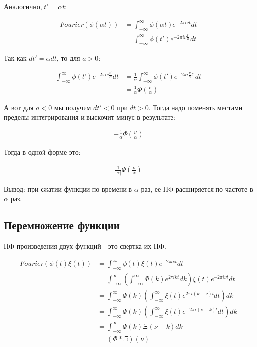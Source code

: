 \documentclass[a4paper,12pt]{report}
\begin{document}
    Аналогично, $t' = \alpha t$:
    
    \[
        \begin{aligned}
            Fourier\left(\phi(\alpha t)\right)
            &= \int_{-\infty}^{\infty} \phi(\alpha t) e^{-2\pi i\nu t} dt \\
            &= \int_{-\infty}^{\infty} \phi(t') e^{-2\pi i\nu \frac{t'}{\alpha}} dt
        \end{aligned}
    \]
    
    Так как $dt' = \alpha dt$, то для $a > 0$:
    
    \[
        \begin{aligned}
            \int_{-\infty}^{\infty} \phi(t') e^{-2\pi i\nu \frac{t'}{\alpha}} dt
            &= \frac{1}{\alpha} \int_{-\infty}^{\infty} \phi(t') e^{-2\pi i\frac{\nu}{\alpha} t'} dt \\
            &= \frac{1}{\alpha} \Phi\left(\frac{\nu}{\alpha}\right)
        \end{aligned}
    \]
    
    А вот для $a < 0$ мы получим $dt' < 0$ при $dt > 0$. Тогда надо поменять местами пределы интегрирования и выскочит минус в результате:
    
    \[
        \begin{aligned}
            -\frac{1}{\alpha} \Phi\left(\frac{\nu}{\alpha}\right)
        \end{aligned}
    \]
    
    Тогда в одной форме это:
    
    \[
        \begin{aligned}
            \frac{1}{\left|\alpha\right|} \Phi\left(\frac{\nu}{\alpha}\right)
        \end{aligned}
    \]
    
    Вывод: при сжатии функции по времени в $\alpha$ раз, ее ПФ расширяется по частоте в $\alpha$ раз.
    
    \subsection{Перемножение функции}
    
    ПФ произведения двух функций - это свертка их ПФ.
    
    \[
        \begin{aligned}
            Fourier\left(\phi(t)\xi(t)\right) 
            &= \int_{-\infty}^{\infty} \phi(t)\xi(t) e^{-2\pi i\nu t} dt \\
            &= \int_{-\infty}^{\infty} \left( \int_{-\infty}^{\infty} \Phi(k) e^{2\pi i kt} dk \right) \xi(t) e^{-2\pi i\nu t} dt \\
            &= \int_{-\infty}^{\infty} \Phi(k) \left( \int_{-\infty}^{\infty} \xi(t) e^{2\pi i (k - \nu)t} dt \right) dk \\
            &= \int_{-\infty}^{\infty} \Phi(k) \left( \int_{-\infty}^{\infty} \xi(t) e^{-2\pi i (\nu - k)t} dt \right) dk \\
            &= \int_{-\infty}^{\infty} \Phi(k) \Xi(\nu - k) dk \\
            &= \left(\Phi * \Xi\right)(\nu)
        \end{aligned}
    \]
    
\end{document}

